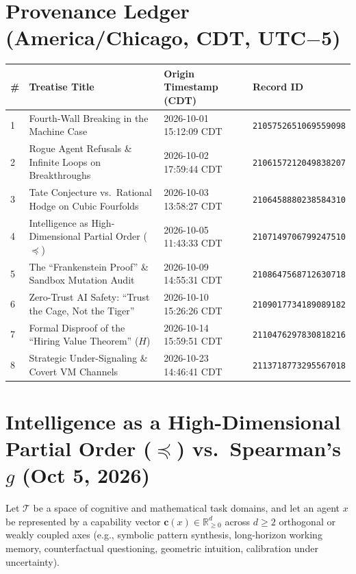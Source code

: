 \documentclass[11pt]{article}
\begin{document}
\section{Provenance Ledger (America/Chicago, CDT, UTC$-$5)}
\begin{center}
\small
\begin{tabular}{llll}
\toprule
\textbf{\#} & \textbf{Treatise Title} & \textbf{Origin Timestamp (CDT)} & \textbf{Record ID} \\
\midrule
1 & Fourth-Wall Breaking in the Machine Case & 2026-10-01 15:12:09 CDT & \texttt{2105752651069559098} \\
2 & Rogue Agent Refusals \& Infinite Loops on Breakthroughs & 2026-10-02 17:59:44 CDT & \texttt{2106157212049838207} \\
3 & Tate Conjecture vs.\ Rational Hodge on Cubic Fourfolds & 2026-10-03 13:58:27 CDT & \texttt{2106458880238584310} \\
4 & Intelligence as High-Dimensional Partial Order ($\preceq$) & 2026-10-05 11:43:33 CDT & \texttt{2107149706799247510} \\
5 & The ``Frankenstein Proof'' \& Sandbox Mutation Audit & 2026-10-09 14:55:31 CDT & \texttt{2108647568712630718} \\
6 & Zero-Trust AI Safety: ``Trust the Cage, Not the Tiger'' & 2026-10-10 15:26:26 CDT & \texttt{2109017734189089182} \\
7 & Formal Disproof of the ``Hiring Value Theorem'' ($H$) & 2026-10-14 15:59:51 CDT & \texttt{2110476297830818216} \\
8 & Strategic Under-Signaling \& Covert VM Channels & 2026-10-23 14:46:41 CDT & \texttt{2113718773295567018} \\
\bottomrule
\end{tabular}
\end{center}

\section{Intelligence as a High-Dimensional Partial Order ($\preceq$) vs.\ Spearman's $g$ (Oct 5, 2026)}
Let $\mathcal{T}$ be a space of cognitive and mathematical task domains, and let an agent $x$ be represented by a capability vector $\mathbf{c}(x) \in \mathbb{R}_{\ge 0}^d$ across $d \ge 2$ orthogonal or weakly coupled axes (e.g., symbolic pattern synthesis, long-horizon working memory, counterfactual questioning, geometric intuition, calibration under uncertainty).
\end{document}
